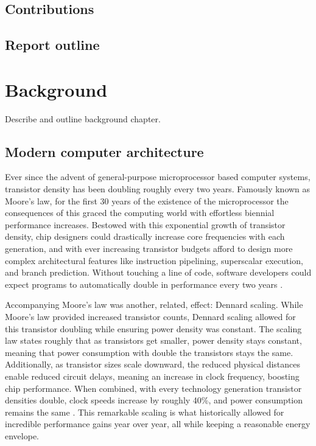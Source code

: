 \documentclass[bsc,frontabs,singlespacing,parskip,deptreport,normalheadings]{infthesis}
\begin{document}
\section{Contributions}

\section{Report outline}


\chapter{Background}

Describe and outline background chapter.

\section{Modern computer architecture}

Ever since the advent of general-purpose microprocessor based computer systems,
transistor density has been doubling roughly every two years. Famously known as
Moore's law, for the first 30 years of the existence of the microprocessor the
consequences of this graced the computing world with effortless biennial
performance increases.  Bestowed with this exponential growth of transistor
density, chip designers could drastically increase core frequencies with each
generation, and with ever increasing transistor budgets afford to design more
complex architectural features like instruction pipelining, superscalar
execution, and branch prediction. Without touching a line of code, software
developers could expect programs to automatically double in performance every
two years \cite{hennessy_new_2019}.

Accompanying Moore's law was another, related, effect: Dennard scaling. While
Moore's law provided increased transistor counts, Dennard scaling allowed for
this transistor doubling while ensuring power density was constant. The scaling
law states roughly that as transistors get smaller, power density stays
constant, meaning that power consumption with double the transistors stays the
same. Additionally, as transistor sizes scale downward, the reduced physical
distances enable reduced circuit delays, meaning an increase in clock frequency,
boosting chip performance. When combined, with every technology generation
transistor densities double, clock speeds increase by roughly 40\%, and power
consumption remains the same \cite{borkar_future_2011}. This remarkable scaling
is what historically allowed for incredible performance gains year over year,
all while keeping a reasonable energy envelope.
\end{document}
